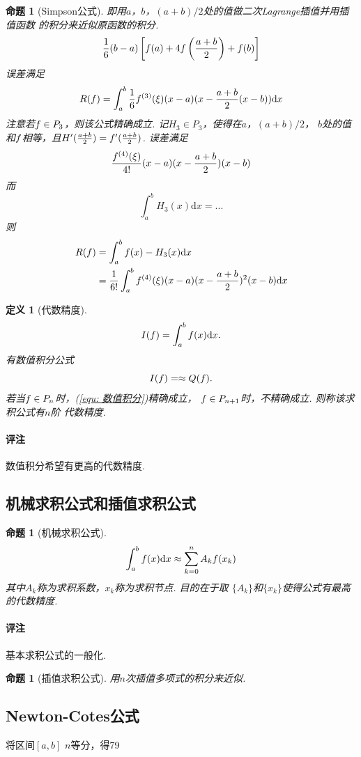 \documentclass[12pt, a4paper]{article}
\theoremstyle{margin}
\newtheorem{pos}[thm]{命题}
\newtheorem{defi}[thm]{定义}
\newcommand{\hp}{^\prime}
\newcommand{\f}{\mathnormal{f}}
\newcommand{\rd}{\mathrm{d}}
\newcommand\equref[1]{(\ref{#1})}
\newcommand{\remark}{\paragraph{评注}}
\begin{document}
  \begin{pos}[Simpson公式]
    即用$a$，$b$，$(a+b)/2$处的值做二次Lagrange插值并用插值函数
    的积分来近似原函数的积分.
    \[
      \frac{1}{6}(b-a)\left[ f(a)+4\f\left(\frac{a+b}{2}\right) + \f(b) \right]
    \]
    误差满足
    \[
      R(\f) = \int_a^b \frac{1}{6}\f^{(3)}(\xi)(x-a)(x-\frac{a+b}{2}(x-b))\rd x
    \]
    注意若$\f\in P_3$，则该公式精确成立. 记$H_3\in P_3$，使得在$a$，$(a+b)/2$，
    $b$处的值和$\f$相等，且$H\hp(\frac{a+b}{2}) = \f\hp(\frac{a+b}{2})$. 误差满足
    \[
      \frac{\f^{(4)}(\xi)}{4!}(x-a)(x-\frac{a+b}{2})(x-b)
    \]
    而
    \[
      \int_a^b H_3(x)\rd x = ...
    \]
    则
    \[\begin{split}
      R(\f) &= \int_a^b\f(x) - H_3(x) \rd x \\
            &= \frac{1}{6!}\int_a^b\f^{(4)}(\xi)(x-a)(x-\frac{a+b}{2})^2(x-b)\rd x
    \end{split}\]
  \end{pos}

  \begin{defi}[代数精度]
    \[
      I(\f) = \int_a^b\f(x)\rd x.
    \]
    有数值积分公式
    \begin{equation}
      \label{equ: 数值积分}
      I(\f) = \approx Q(\f).
    \end{equation}
    若当$\f\in P_n$时，\equref{equ: 数值积分}精确成立，
    $\f\in P_{n+1}$时，不精确成立. 则称该求积公式有$n$阶
    代数精度.
  \end{defi}
  \remark
    数值积分希望有更高的代数精度.

\subsection{机械求积公式和插值求积公式}
  \begin{pos}[机械求积公式]
    \[
      \int_a^b \f(x)\rd x \approx
      \sum_{k=0}^n A_k\f(x_k)
    \]
    其中$A_k$称为求积系数，$x_k$称为求积节点. 目的在于取
    $\{A_k\}$和$\{x_k\}$使得公式有最高的代数精度.
  \end{pos}
  \remark
    基本求积公式的一般化.

  \begin{pos}[插值求积公式]
    用$n$次插值多项式的积分来近似.
  \end{pos}

\subsection{Newton-Cotes公式}
  将区间$[a, b]$ $n$等分，得79
\end{document}
